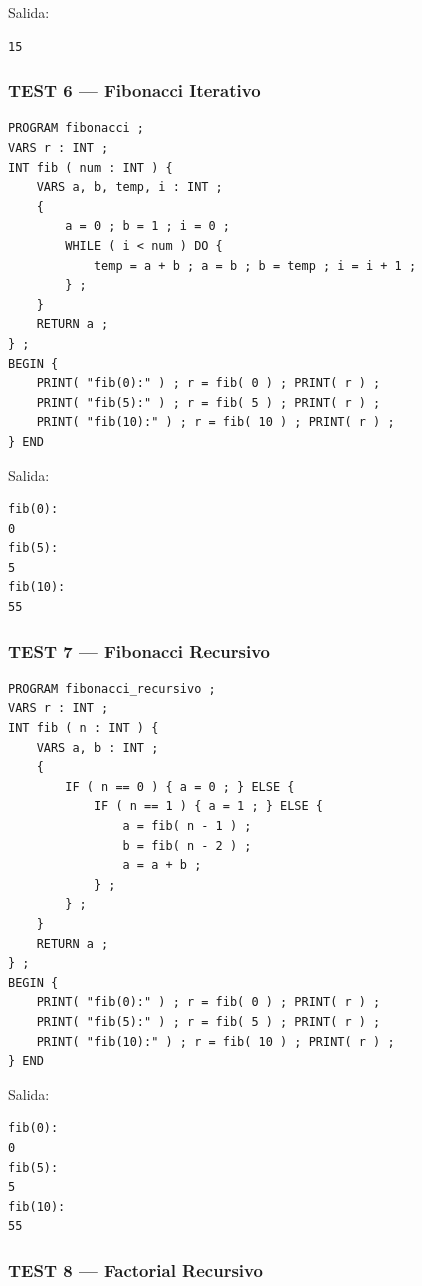 \documentclass[12pt, letterpaper]{article}
\theoremstyle{definition}
\begin{document}
Salida:
\begin{verbatim}
15
\end{verbatim}

\subsubsection*{TEST 6 --- Fibonacci Iterativo}


\begin{verbatim}
PROGRAM fibonacci ;
VARS r : INT ;
INT fib ( num : INT ) {
    VARS a, b, temp, i : INT ;
    {
        a = 0 ; b = 1 ; i = 0 ;
        WHILE ( i < num ) DO {
            temp = a + b ; a = b ; b = temp ; i = i + 1 ;
        } ;
    }
    RETURN a ;
} ;
BEGIN {
    PRINT( "fib(0):" ) ; r = fib( 0 ) ; PRINT( r ) ;
    PRINT( "fib(5):" ) ; r = fib( 5 ) ; PRINT( r ) ;
    PRINT( "fib(10):" ) ; r = fib( 10 ) ; PRINT( r ) ;
} END
\end{verbatim}

Salida:
\begin{verbatim}
fib(0):
0
fib(5):
5
fib(10):
55
\end{verbatim}

\subsubsection*{TEST 7 --- Fibonacci Recursivo}

\begin{verbatim}
PROGRAM fibonacci_recursivo ;
VARS r : INT ;
INT fib ( n : INT ) {
    VARS a, b : INT ;
    {
        IF ( n == 0 ) { a = 0 ; } ELSE {
            IF ( n == 1 ) { a = 1 ; } ELSE {
                a = fib( n - 1 ) ;
                b = fib( n - 2 ) ;
                a = a + b ;
            } ;
        } ;
    }
    RETURN a ;
} ;
BEGIN {
    PRINT( "fib(0):" ) ; r = fib( 0 ) ; PRINT( r ) ;
    PRINT( "fib(5):" ) ; r = fib( 5 ) ; PRINT( r ) ;
    PRINT( "fib(10):" ) ; r = fib( 10 ) ; PRINT( r ) ;
} END
\end{verbatim}

Salida:
\begin{verbatim}
fib(0):
0
fib(5):
5
fib(10):
55
\end{verbatim}

\subsubsection*{TEST 8 --- Factorial Recursivo}
\end{document}
